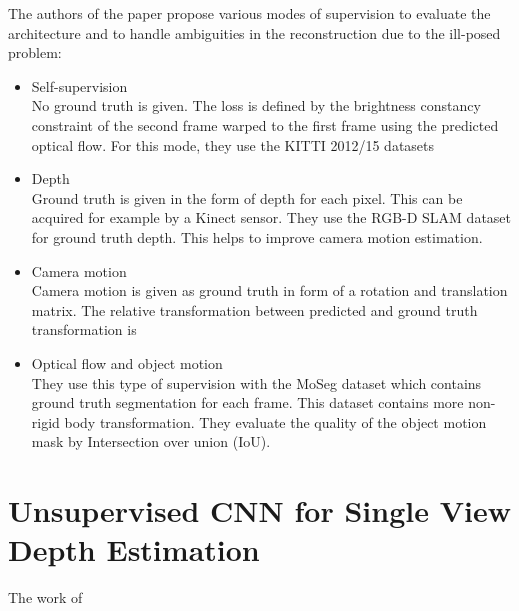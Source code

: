         The authors of the paper propose various modes of supervision to evaluate the architecture and to handle ambiguities in the reconstruction due to the ill-posed problem:
        \begin{itemize}
            \item Self-supervision
                \\
                No ground truth is given.
                The loss is defined by the brightness constancy constraint of the second frame warped to the first frame using the predicted optical flow.
                For this mode, they use the {KITTI} 2012/15 datasets
            \item Depth
                \\
                Ground truth is given in the form of depth for each pixel.
                This can be acquired for example by a Kinect sensor.
                They use the {RGB-D SLAM} dataset for ground truth depth.
                This helps to improve camera motion estimation. 
            \item Camera motion
                \\
                Camera motion is given as ground truth in form of a rotation and translation matrix.
                The relative transformation between predicted and ground truth transformation is 
            \item Optical flow and object motion
                \\
                They use this type of supervision with the MoSeg dataset which contains ground truth segmentation for each frame.
                This dataset contains more non-rigid body transformation.
                They evaluate the quality of the object motion mask by Intersection over union (IoU).
        \end{itemize}
        
    \section{Unsupervised CNN for Single View Depth Estimation}
    
        The work of \citet{garg2016} 